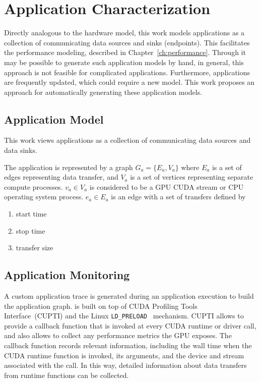 \chapter{Application Characterization}


Directly analogous to the hardware model, this work models applications as a collection of communicating data sources and sinks (endpoints).
This facilitates the performance modeling, described in Chapter~\ref{ch:performance}.
Through it may be possible to generate such application models by hand, in general, this approach is not feasible for complicated applications.
Furthermore, applications are frequently updated, which could require a new model.
This work proposes an approach for automatically generating these application models.


\section{Application Model}

This work views applications as a collection of communicating data sources and data sinks.

The application is represented by a graph $G_a = \{E_a,V_a\}$ where $E_a$ is a set of edges representing data transfer, and $V_a$ is a set of vertices representing separate compute processes.
$v_a \in V_a$ is considered to be a GPU CUDA stream or CPU operating system process.
$e_a \in E_a$ is an edge with a set of transfers defined by
\begin{enumerate}
    \item start time
    \item stop time
    \item transfer size
\end{enumerate}

\section{Application Monitoring}



A custom application trace is generated during an application execution to build the application graph.
 is built on top of CUDA Profiling Tools Interface~\cite{nvidia2017cupti}(CUPTI) and the Linux \texttt{LD\_PRELOAD}~\cite{kerrisk2017ld} mechanism.
CUPTI allows  to provide a callback function that is invoked at every CUDA runtime or driver call, and also allows  to collect any performance metrics the GPU exposes.
The callback function records relevant information, including the wall time when the CUDA runtime function is invoked, its arguments, and the device and stream associated with the call.
In this way, detailed information about data transfers from runtime functions can be collected.

